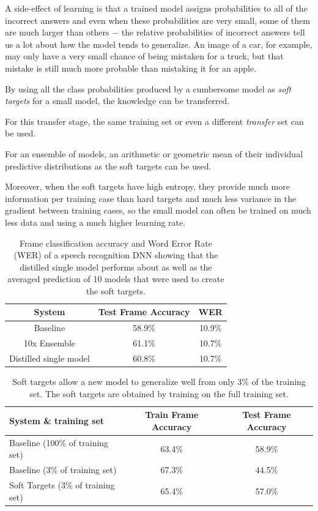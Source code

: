 \documentclass[a4paper,twocolumn]{article}
\begin{document}
A side-effect of learning is that a trained model assigns probabilities to all of the incorrect answers and even when these probabilities are very small, some of them are much larger than others $-$ the relative probabilities of incorrect answers tell us a lot about how the model tends to generalize. An image of a car, for example, may only have a very small chance of being mistaken for a truck, but that mistake is still much more probable than mistaking it for an apple.

By using all the class probabilities produced by a cumbersome model as \textit{soft targets} for a small model, the knowledge can be transferred.

For this transfer stage, the same training set or even a different \textit{transfer} set can be used.

For an ensemble of models, an arithmetic or geometric mean of their individual predictive distributions as the soft targets can be used.

Moreover, when the soft targets have high entropy, they provide much more information per training case than hard targets and much less variance in the gradient between training cases, so the small model can often be trained on much less data and using a much higher learning rate.

\begin{table}[t]
    \center
    \begin{tabular}{| c | c | c |}
        \hline
        System                 & Test Frame Accuracy & WER    \\ \hline
        Baseline               & 58.9\%              & 10.9\% \\
        10x Ensemble           & 61.1\%              & 10.7\% \\
        Distilled single model & 60.8\%              & 10.7\% \\
        \hline
    \end{tabular}
    \caption{Frame classification accuracy and Word Error Rate (WER) of a speech recognition DNN showing that the distilled single model performs about as well as the averaged prediction of 10 models that were used to create the soft targets.}
\end{table}

\begin{table}[t]
    \center
    \begin{tabular}{| l | c | c |}
        \hline
        System \& training set             & Train Frame Accuracy & Test Frame Accuracy \\ \hline
        Baseline (100\% of training set)   & 63.4\%               & 58.9\%              \\
        Baseline (3\% of training set)     & 67.3\%               & 44.5\%              \\
        Soft Targets (3\% of training set) & 65.4\%               & 57.0\%              \\
        \hline
    \end{tabular}
    \caption{Soft targets allow a new model to generalize well from only 3\% of the training set. The soft targets are obtained by training on the full training set.}
\end{table}
\end{document}
